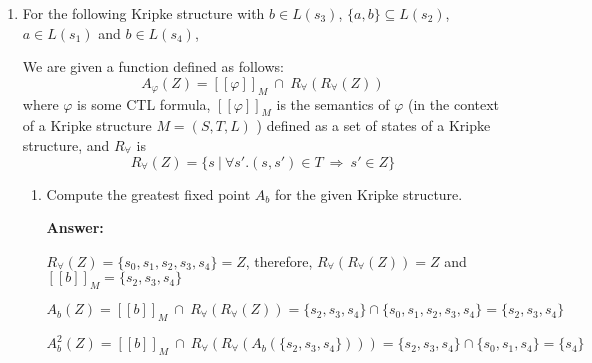 \documentclass[11pt]{article}
\newcommand{\sem}[1]{[\!\![#1]\!\!]}
\begin{document}
\begin{enumerate}

\item For the following Kripke structure with $b\in L(s_3)$, $\{a, b\}\subseteq L(s_2)$, $a\in L(s_1)$ and
  $b\in L(s_4)$,
        \begin{center}
        \end{center}
 We are given a function defined as follows:
        \[
        A_{\varphi}(Z) = \sem{\varphi}_M \ \cap\ R_{\forall}(R_{\forall}(Z))
        \]
 where $\varphi$ is some CTL formula, $\sem{\varphi}_M$ is the
 semantics of $\varphi$ (in the context of a Kripke structure $M = (S,
 T, L)$ ) defined as a set of states of a Kripke structure, and
 $R_{\forall}$ is
        \[
        R_{\forall}(Z) = \{s~|~\forall s'. (s, s') \in T \ \Rightarrow \ s' \in Z\}
        \]
 \begin{enumerate}
 \item Compute the greatest fixed point $A_{b}$ for the given Kripke structure.
 
\textbf{Answer:}

$R_{\forall}(Z) = \{ s_0, s_1, s_2, s_3, s_4\} = Z$, therefore, $R_{\forall}(R_{\forall}(Z)) = Z$ and $\sem{b}_M = \{s_2, s_3, s_4\}$

\[ A_{b}(Z) = \sem{b}_M \ \cap\ R_{\forall}(R_{\forall}(Z))  = \{ s_2, s_3, s_4\} \cap \{ s_0, s_1, s_2, s_3, s_4\}  = \{ s_2, s_3, s_4\}\]

\[ A^2_{b}(Z) = \sem{b}_M \ \cap\ R_{\forall}(R_{\forall}(A_{b}(\{ s_2, s_3, s_4\})))  = \{ s_2, s_3, s_4\} \cap \{ s_0, s_1, s_4\}  = \{ s_4\}\]


\end{enumerate}
\end{enumerate}
\end{document}
